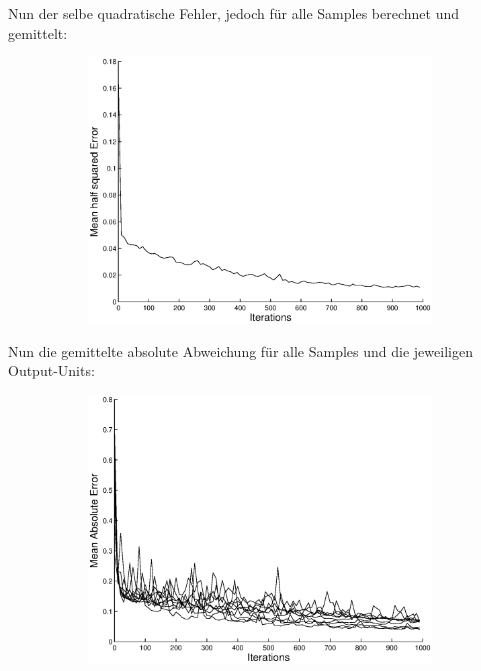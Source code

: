 \documentclass{article}
\begin{document}
	Nun der selbe quadratische Fehler, jedoch für alle Samples berechnet und gemittelt:
	\begin{figure}[H]
	  \begin{subfigure}
	    \centering
	    \includegraphics[scale=0.75]{lr100_1K/task2-sq-mean-err.eps}
	  \end{subfigure}
	\end{figure}
	
	Nun die gemittelte absolute Abweichung für alle Samples und die jeweiligen Output-Units:
	\begin{figure}[H]
	  \begin{subfigure}
	    \centering
	    \includegraphics[scale=0.75]{lr100_1K/task2-abs-err.eps}
	  \end{subfigure}
	\end{figure}
  
\end{document}
